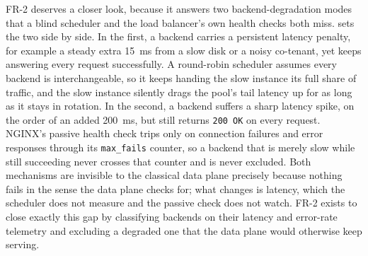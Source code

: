 FR-2 deserves a closer look, because it answers two backend-degradation modes that a
blind scheduler and the load balancer's own health checks both miss.
 sets the two side by side. In the first, a backend carries a
persistent latency penalty, for example a steady extra 15~ms from a
slow disk or a noisy co-tenant, yet keeps answering every request successfully. A
round-robin scheduler assumes every backend is interchangeable, so it keeps handing
the slow instance its full share of traffic, and the slow instance silently drags the
pool's tail latency up for as long as it stays in rotation. In the second, a backend
suffers a sharp latency spike, on the order of an added 200~ms, but
still returns \texttt{200~OK} on every request. NGINX's passive health check trips only
on connection failures and error responses through its \texttt{max\_fails} counter, so
a backend that is merely slow while still succeeding never crosses that counter and is
never excluded. Both mechanisms are invisible to the classical data plane precisely
because nothing fails in the sense the data plane checks for; what changes is latency,
which the scheduler does not measure and the passive check does not watch. FR-2 exists
to close exactly this gap by classifying backends on their latency and error-rate
telemetry and excluding a degraded one that the data plane would otherwise keep
serving.

